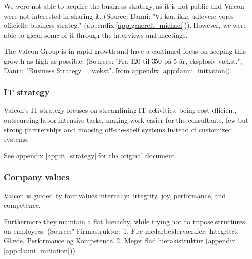 We were not able to acquire the business strategy, as it is not public and Valcon were not interested in sharing it. (Source: Danni: "Vi kan ikke udlevere vores officielle business strategi" (appendix \ref{app:generelt_michael})). 
However, we were able to glean some of it through the interviews and meetings.

The Valcon Group is in rapid growth and have a continued focus on keeping this growth as high as possible. (Sources: "Fra 120 til 350 på 5 år, eksplosiv vækst.", Danni: "Business Strategy = vækst". from appendix \ref{app:danni_initiation}).

\subsubsection{IT strategy}
Valcon's IT strategy focuses on streamlining IT activities, being cost efficient, outsourcing labor intensive tasks, making work easier for the consultants, few but strong partnerships and choosing off-the-shelf systems instead of customized systems.

See appendix \ref{app:it_strategy} for the original document. 

\subsubsection{Company values}
Valcon is guided by four values internally: Integrity, joy, performance, and competence.

Furthermore they maintain a flat hierachy, while trying not to impose structures on employees. (Source:" Firmastruktur: 1. Fire medarbejderværdier: Integritet, Glæde, Performance og Kompetence. 2. Meget flad hierakistruktur (appendix \ref{app:danni_initiation}))